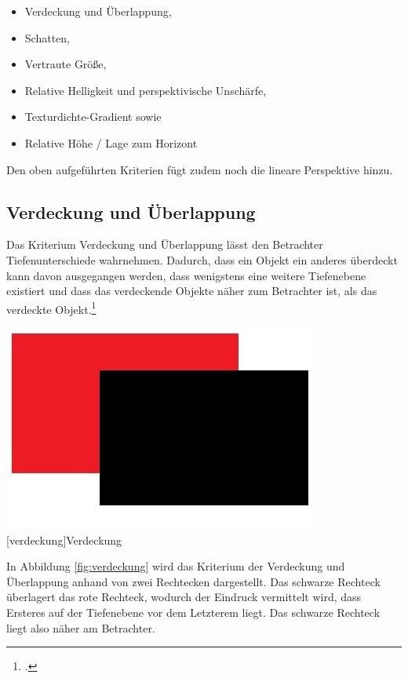 \begin{itemize}
\item Verdeckung und Überlappung,
\item Schatten,
\item Vertraute Größe,
\item Relative Helligkeit und perspektivische Unschärfe,
\item Texturdichte-Gradient sowie
\item Relative Höhe / Lage zum Horizont
\end{itemize}

Den oben aufgeführten Kriterien fügt \cite{leyh10} zudem noch die lineare Perspektive hinzu.

\subsection{Verdeckung und Überlappung}
Das Kriterium Verdeckung und Überlappung lässt den Betrachter Tiefenunterschiede wahrnehmen. Dadurch, dass ein Objekt ein anderes überdeckt kann davon ausgegangen werden, dass wenigstens eine weitere Tiefenebene existiert und dass das verdeckende Objekte näher zum Betrachter ist, als das verdeckte Objekt.\footcite[Vgl.]{heidXX}

\vspace{1em}
\begin{minipage}{\linewidth}
	\centering
	\includegraphics[width=0.7\linewidth]{images/verdeckung.jpg}
	[verdeckung]{Verdeckung}
	\label{fig:verdeckung}
\end{minipage}
\vspace{1em} 

In Abbildung \ref{fig:verdeckung} wird das Kriterium der Verdeckung und Überlappung anhand von zwei Rechtecken dargestellt. Das schwarze Rechteck überlagert das rote Rechteck, wodurch der Eindruck vermittelt wird, dass Ersteres auf der Tiefenebene vor dem Letzterem liegt. Das schwarze Rechteck liegt also näher am Betrachter.

